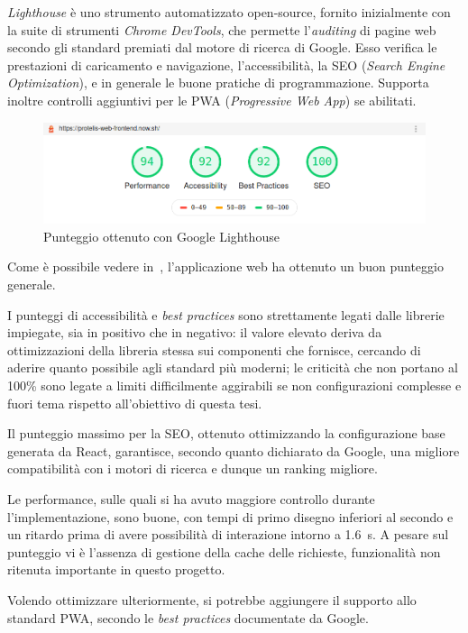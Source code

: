     \emph{Lighthouse} è uno strumento automatizzato open-source, fornito inizialmente con la suite di strumenti \emph{Chrome DevTools}, che permette l'\emph{auditing} di pagine web secondo gli standard premiati dal motore di ricerca di Google.
    Esso verifica le prestazioni di caricamento e navigazione, l'accessibilità, la SEO (\emph{\emph{S}earch \emph{E}ngine \emph{O}ptimization}), e in generale le buone pratiche di programmazione.
    Supporta inoltre controlli aggiuntivi per le PWA (\emph{\emph{P}rogressive \emph{W}eb \emph{A}pp}) se abilitati.

    \begin{figure}
      \centering
      \includegraphics[width=\textwidth]{res/tests/Screenshot_2020-03-04 Lighthouse Report Viewer.png}%
      \caption{Punteggio ottenuto con Google Lighthouse}%
      \label{fig:lighthouse}
    \end{figure}

    Come è possibile vedere in~, l'applicazione web ha ottenuto un buon punteggio generale.

    I punteggi di accessibilità e \emph{best practices} sono strettamente legati dalle librerie impiegate, sia in positivo che in negativo:
    il valore elevato deriva da ottimizzazioni della libreria stessa sui componenti che fornisce, cercando di aderire quanto possibile agli standard più moderni;
    le criticità che non portano al 100\% sono legate a limiti difficilmente aggirabili se non configurazioni complesse e fuori tema rispetto all'obiettivo di questa tesi.

    Il punteggio massimo per la SEO, ottenuto ottimizzando la configurazione base generata da React, garantisce, secondo quanto dichiarato da Google, una migliore compatibilità con i motori di ricerca e dunque un ranking migliore.

    Le performance, sulle quali si ha avuto maggiore controllo durante l'implementazione, sono buone, con tempi di primo disegno inferiori al secondo e un ritardo prima di avere possibilità di interazione intorno a \SI{1.6}{\second}.
    A pesare sul punteggio vi è l'assenza di gestione della cache delle richieste, funzionalità non ritenuta importante in questo progetto.

    Volendo ottimizzare ulteriormente, si potrebbe aggiungere il supporto allo standard PWA, secondo le \emph{best practices} documentate da Google.

